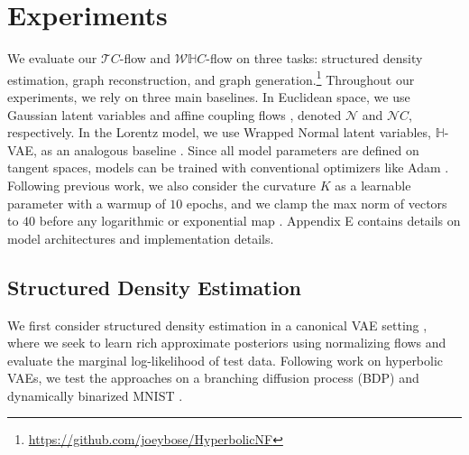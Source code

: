 \section{Experiments}
\label{experiments}
We evaluate our $\mathcal{T}C$-flow and $\mathcal{W}\mathbb{H}C$-flow on three tasks:  structured density estimation, graph reconstruction, and graph generation.\footnote{\url{https://github.com/joeybose/HyperbolicNF}} Throughout our experiments, we rely on three main baselines. %
In Euclidean space, we use Gaussian latent variables and affine coupling flows \cite{dinh2016density}, denoted $\mathcal{N}$ and $\mathcal{N}C$, respectively. In the Lorentz model, we use Wrapped Normal latent variables, $\mathbb{H}$-VAE, as an analogous baseline \cite{nagano2019wrapped}. Since all model parameters are defined on tangent spaces, models can be trained with conventional optimizers like Adam \cite{kingma2014adam}. Following previous work, we also consider the curvature $K$ as a learnable parameter with a warmup of $10$ epochs,
and we clamp the max norm of vectors to $40$ before any logarithmic or exponential map \cite{skopek2019mixed}. Appendix E contains details on model architectures and implementation details. 

\subsection{Structured Density Estimation}
We first consider structured density estimation in a canonical VAE setting \cite{kingma2013auto}, where we seek to learn rich approximate posteriors using normalizing flows and evaluate the marginal log-likelihood of test data. Following work on hyperbolic VAEs, we test the approaches on a branching diffusion process (BDP) and dynamically binarized MNIST \cite{mathieu2019continuous,skopek2019mixed}. 

